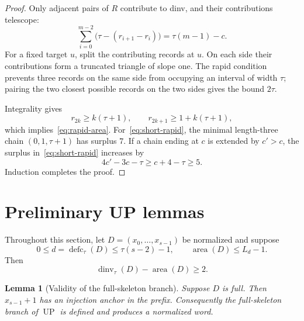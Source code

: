 \documentclass[11pt]{article}
\newtheorem{lemma}[theorem]{Lemma}
\theoremstyle{definition}
\theoremstyle{remark}
\newcommand{\area}{\operatorname{area}}
\newcommand{\dinv}{\operatorname{dinv}}
\newcommand{\defc}{\operatorname{defc}}
\newcommand{\UP}{\operatorname{UP}}
\begin{document}
\begin{proof}
Only adjacent pairs of $R$ contribute to dinv, and their contributions
 telescope:
\[
 \sum_{i=0}^{m-2}\bigl(\tau-(r_{i+1}-r_i)\bigr)
 =\tau(m-1)-c.
\]
For a fixed target $u$, split the contributing records at $u$.  On each side
their contributions form a truncated triangle of slope one.  The rapid
condition prevents three records on the same side from occupying an interval
of width $\tau$; pairing the two closest possible records on the two sides
gives the bound $2\tau$.

Integrality gives
\[
  r_{2k}\ge k(\tau+1),
  \qquad r_{2k+1}\ge1+k(\tau+1),
\]
which implies~\eqref{eq:rapid-area}.  For~\eqref{eq:short-rapid}, the minimal
length-three chain $(0,1,\tau+1)$ has surplus $7$.  If a chain ending at $c$
is extended by $c'>c$, the surplus in~\eqref{eq:short-rapid} increases by
\[
  4c'-3c-\tau\ge c+4-\tau\ge5.
\]
Induction completes the proof.
\end{proof}

\section{Preliminary UP lemmas}

Throughout this section, let $D=(x_0,\ldots,x_{s-1})$ be normalized and
suppose
\begin{equation}
  0\le d=\defc_\tau(D)\le\tau(s-2)-1,
  \qquad \area(D)\le L_d-1.
  \label{eq:up-hyp}
\end{equation}
Then
\begin{equation}
  \dinv_\tau(D)-\area(D)\ge2.
  \label{eq:strict-lower-gap}
\end{equation}

\begin{lemma}[Validity of the full-skeleton branch]
\label{lem:up-skeleton}
Suppose $D$ is full.  Then $x_{s-1}+1$ has an injection anchor in the prefix.
Consequently the full-skeleton branch of $\UP$ is defined and produces a
normalized word.
\end{lemma}
\end{document}
